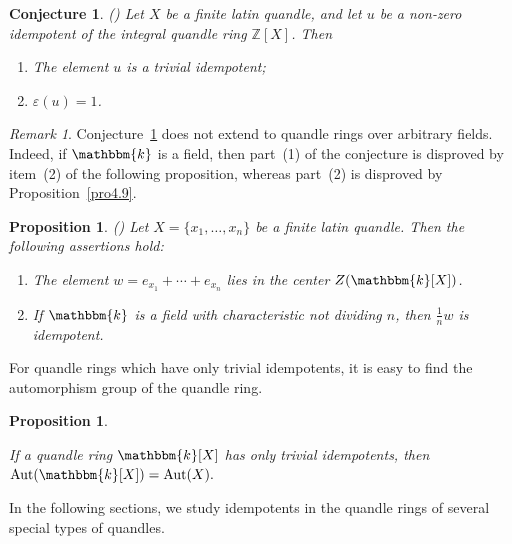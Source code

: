 \documentclass[12pt]{amsart}
\newtheorem{pro}[thm]{Proposition}
\newtheorem{conj}[thm]{Conjecture}
\theoremstyle{definition}
\theoremstyle{remark}
\newtheorem{remark}[thm]{Remark}
\newcommand{\Z}{\mathbb{Z}}
\def\Aut{\operatorname{Aut}}
\begin{document}
 \begin{conj}\label{conjid}  (\cite[Conjecture 13.19]{BES})  Let $X$ be a finite latin quandle, and let $u$  be  a non-zero idempotent of the integral quandle ring $\mathbb{Z}[X]$. Then
 
 \begin{enumerate}
 \item
 The element $u$ is a trivial idempotent;

\item
 $\varepsilon(u) = 1$. 
 \end{enumerate}
\end{conj}


\begin{remark}
Conjecture~\ref{conjid} does not extend to quandle rings over arbitrary fields. Indeed, if $\mathbbm{k}$ is a field, then part~(1) of the conjecture is disproved by item~(2) of the following proposition, whereas part~(2) is disproved by Proposition~\ref{pro4.9}.
\end{remark}


\begin{pro} (\cite[Proposition 12.18]{BES})
Let $X = \{ x_1, \ldots, x_n \}$ be a finite latin quandle. Then the following  assertions hold:
\begin{enumerate}
\item The element $w = e_{x_1} + \cdots + e_{x_n}$ lies in the center  $Z(\mathbbm{k}[X])$.
\item If $\mathbbm{k}$ is a field with characteristic not dividing $n$, then $\frac{1}{n}w$ is idempotent.
\end{enumerate}
\end{pro}

For quandle rings which have only trivial idempotents, it is easy to find the automorphism group of the quandle ring.



\begin{pro}\label{AutLatin}
	
	If a quandle ring $\mathbbm{k}[X]$ has only trivial idempotents,  then $\Aut(\mathbbm{k}[X]) = \Aut(X).$
	
	
\end{pro}

In the following sections, we study idempotents in the quandle rings of several special types of quandles.
\end{document}
